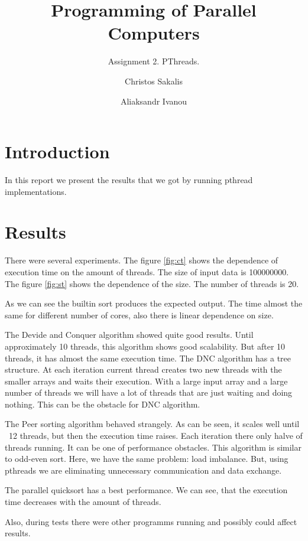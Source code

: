 \documentclass[11pt, a4paper]{scrartcl}
\title{Programming of Parallel Computers}
\subtitle{Assignment 2. PThreads.}
\author{Christos Sakalis \\ \email{Christos.Sakalis.3822@student.uu.se}
    \and Aliaksandr Ivanou \\ \email{Aliaksandr.Ivanou.1364@student.uu.se}}
\begin{document}
\maketitle

\section{Introduction}

In this report we present the results that we got by running pthread implementations.

\section{Results}

There were several experiments. The figure \ref{fig:ct} shows the dependence of execution time on the amount of threads. The size of input data is 100000000. The figure \ref{fig:st} shows the dependence of the size. The number of threads is 20.

As we can see the builtin sort produces the expected output. The time almost the same for different number of cores, also there is linear dependence on size.

The Devide and Conquer algorithm showed quite good results. Until approximately 10 threads, this algorithm shows good scalability. But after 10 threads, it has almost the same execution time. The DNC algorithm has a tree structure. At each iteration current thread creates two new threads with the smaller arrays and waits their execution. With a large input array and a large number of threads we will have a lot of threads that are just waiting and doing nothing. This can be the obstacle for DNC algorithm. 

The Peer sorting algorithm behaved strangely. As can be seen, it scales well until ~12 threads, but then the execution time raises. Each iteration there only halve of threads running. It can be one of performance obstacles. This algorithm is similar to odd-even sort. Here, we have the same problem: load imbalance. But, using pthreads we are eliminating unnecessary communication and data exchange.

The parallel quicksort has a best performance. We can see, that the execution time decreases with the amount of threads. 

Also, during tests there were other programms running and possibly could affect results.
\end{document}
